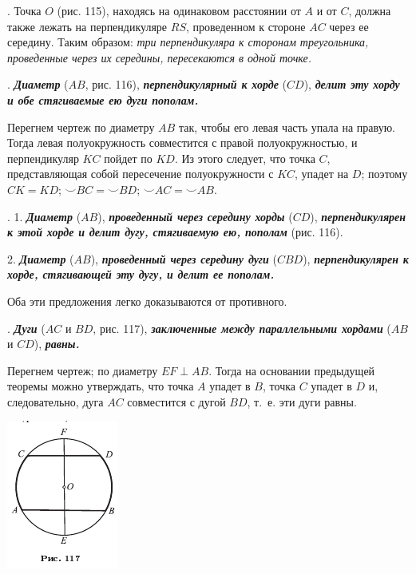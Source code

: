 \documentclass[oneside]{book}
\begin{document}
.
Точка $O$ (рис. 115), находясь на одинаковом расстоянии от $A$ и от $C$, должна также лежать на перпендикуляре $RS$, проведенном к стороне $AC$ через ее середину.
Таким образом:
\emph{три перпендикуляра к сторонам треугольника, проведенные через их середины, пересекаются в одной точке.}

.
\textbf{\emph{Диаметр}} ($AB$, рис. 116), \textbf{\emph{перпендикулярный к хорде}} ($CD$), \textbf{\emph{делит эту хорду и обе стягиваемые ею дуги пополам.}}

Перегнем чертеж по диаметру $AB$ так, чтобы его левая часть упала на правую.
Тогда левая полуокружность совместится с правой полуокружностью, и перпендикуляр $KC$ пойдет по $KD$.
Из этого следует, что точка $C$, представляющая собой пересечение полуокружности с $KC$, упадет на $D$;
поэтому $CK=KD$;
${\smallsmile} BC={\smallsmile} BD$;
${\smallsmile} AC={\smallsmile} AB$.

.
1.
\textbf{\emph{Диаметр}} ($AB$), \textbf{\emph{проведенный через середину хорды}} ($CD$), \textbf{\emph{перпендикулярен к этой хорде и делит дугу, стягиваемую ею, пополам}} (рис. 116).

2.
\textbf{\emph{Диаметр}} ($AB$), \textbf{\emph{проведенный через середину дуги}} ($CBD$), \textbf{\emph{перпендикулярен к хорде, стягивающей эту дугу, и делит ее пополам.}}

Оба эти предложения легко доказываются от противного.

.
\textbf{\emph{Дуги}} ($AC$ и $BD$, рис. 117), \textbf{\emph{заключенные между параллельными хордами}} ($AB$ и $CD$), \textbf{\emph{равны.}}

Перегнем чертеж;
по диаметру $EF\perp AB$.
Тогда на основании предыдущей теоремы можно утверждать, что точка $A$ упадет в $B$, точка $C$ упадет в $D$ и, следовательно, дуга $AC$ совместится с дугой $BD$, т.~е. эти дуги равны.

\includegraphics{pics/ris-117}
\end{document}
